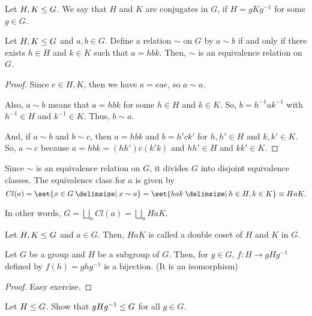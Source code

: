 \documentclass[11pt]{penrose}
\begin{document}
\begin{ndfn}
    Let $H, K \mathrel{\leq} G$. We say that $H$ and $K$ are conjugates in $G$, if $H = g K g^{-1}$ for some $g \in G$.
\end{ndfn}

\begin{nprop}
    Let $H, K \mathrel{\leq} G$ and $a, b \in G$. Define a relation $\sim$ on $G$ by $a \sim b$ if and only if there exists $h \in H$ and $k \in K$ such that $a = hbk$. Then, $\sim$ is an equivalence relation on $G$.
\end{nprop}
\begin{proof}
    Since $e \in H, K$, then we have $a = e a e$, so $a \sim a$.

    Also, $a \sim b$ means that $a = hbk$ for some $h \in H$ and $k \in K$. So, $b = h^{-1} a k^{-1}$ with $h^{-1} \in H$ and $k^{-1} \in K$. Thus, $b \sim a$.

    And, if $a \sim b$ and $b \sim c$, then $a = hbk$ and $b = h'ck'$ for $h, h' \in H$ and $k, k' \in K$. So, $a \sim c$ because $a = h b k = (h h') c (k' k)$ and $hh' \in H$ and $kk' \in K$.
\end{proof}

\begin{remark}
    Since $\sim$ is an equivalence relation on $G$, it divides $G$ into disjoint equivalence classes. The equivalence class for $a$ is given by
    \begin{equation*}
        Cl(a)
        = \set{x \in G \st x \sim a}
        = \set{hak \st h \in H, k \in K}
        \equiv HaK.
    \end{equation*}

    In other words, $G = \bigsqcup_{a} Cl(a) = \bigsqcup_{a} HaK$.
\end{remark}

\begin{ndfn}
    Let $H, K \mathrel{\leq} G$ and $a \in G$. Then, $HaK$ is called a double coset of $H$ and $K$ in $G$.
\end{ndfn}

\begin{nlemma}
    Let $G$ be a group and $H$ be a subgroup of $G$. Then, for $g \in G$, $f : H \to g H g^{-1}$ defined by $f(h) = ghg^{-1}$ is a bijection. (It is an isomorphism)
\end{nlemma}
\begin{proof}
    Easy exercise.
\end{proof}

\begin{nex}
    Let $H \mathrel{\leq} G$. Show that $gHg^{-1} \mathrel{\leq} G$ for all $g \in G$.
\end{nex}
\end{document}
